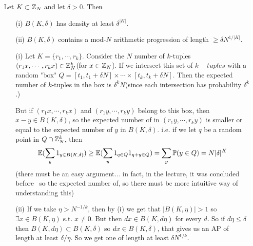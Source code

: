 \documentclass[10pt,a4paper]{report}
\newenvironment{proof}
{\begin{changemargin}{1cm}{0.5cm} 
	}%
	{\end{changemargin}
}
\begin{document}
 Let $K \subset \mathbb{Z}_N$ and let $\delta >0$. Then
\begin{itemize}
\item[(i)] $B(K,\delta)$ has density at least $\delta^{|K|}$.
\item[(ii)] $B(K,\delta)$ contains a mod-$N$ arithmetic progression of length $\geq \delta N^{1/|K|}$.
\end{itemize}
\begin{proof}
\pf

\begin{itemize}
\item[(i)]Let $K = \{r_1,\cdots, r_k\}$. Consider the $N$ number of $k$-tuples $(r_1 x, \cdots, r_k x)\in \mathbb{Z}_N^k$(for $x\in \mathbb{Z}_N$). If we intersect this set of $k-tuples$ with a random "box" $Q=[t_1,t_1+\delta N] \times \cdots \times [t_k,t_k+\delta N]$. Then the expected number of $k$-tuples in the box is $\delta^k N$(since each intersection has probability $\delta^k$.)

\quad But if $(r_1 x,\cdots, r_k x)$  and $(r_1 y,\cdots, r_k y)$ belong to this box, then $x-y \in B(K,\delta)$, so the expected number of in $(r_1 y,\cdots, r_k y)$ is smaller or equal to the expected number of $y$ in $B(K,\delta)$. i.e. if we let $q$ be a random point in $Q \cap \mathbb{Z}_N^k$, then
\begin{align*}
\mathbb{E}( \sum_y 1_{y\in B(K,\delta)}) \geq \mathbb{E}(\sum_{y} 1_{q \in Q} 1_{q + y  \in Q}) = \sum_y \mathbb{P} ( y\in Q  ) = N |\delta|^{K}
\end{align*}
(there must be an easy argument... in fact, in the lecture, it was concluded before ~so the expected number of, so there must be more intuitive way of understanding this)
\item[(ii)] If we take $\eta > N^{-1/k}$, then by (i) we get that $|B(K,\eta)|>1$ so $\exists x \in B(K,\eta)$ s.t. $x\neq 0$. But then $dx \in B(K,d\eta)$ for every $d$. So if $d\eta \leq \delta$ then $B(K,d\eta) \subset B(K,\delta)$ so $dx\in B(K,\delta)$, that gives us an AP of length at least $\delta/\eta$. So we get one of length at least $\delta N^{1/k}$.
\end{itemize} 
\eop
\end{proof}
\end{document}
